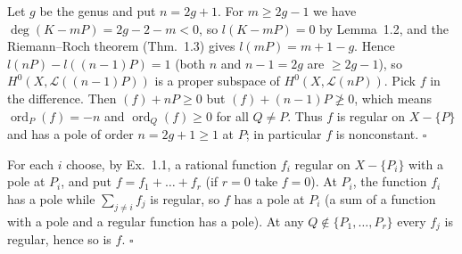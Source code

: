 \documentclass[11pt]{article}
\begin{document}
\pf
Let $g$ be the genus and put $n=2g+1$. For $m\ge 2g-1$ we have $\deg(K-mP)=2g-2-m<0$, so $l(K-mP)=0$ by Lemma~1.2, and the Riemann--Roch theorem (Thm.~1.3) gives $l(mP)=m+1-g$. Hence $l(nP)-l((n-1)P)=1$ (both $n$ and $n-1=2g$ are $\ge 2g-1$), so $H^0(X,\mathcal L((n-1)P))$ is a proper subspace of $H^0(X,\mathcal L(nP))$. Pick $f$ in the difference. Then $(f)+nP\ge0$ but $(f)+(n-1)P\not\ge0$, which means $\operatorname{ord}_P(f)=-n$ and $\operatorname{ord}_Q(f)\ge0$ for all $Q\ne P$. Thus $f$ is regular on $X-\{P\}$ and has a pole of order $n=2g+1\ge1$ at $P$; in particular $f$ is nonconstant. \hfill$\square$

\pf
For each $i$ choose, by Ex.~1.1, a rational function $f_i$ regular on $X-\{P_i\}$ with a pole at $P_i$, and put $f=f_1+\dots+f_r$ (if $r=0$ take $f=0$). At $P_i$, the function $f_i$ has a pole while $\sum_{j\ne i}f_j$ is regular, so $f$ has a pole at $P_i$ (a sum of a function with a pole and a regular function has a pole). At any $Q\notin\{P_1,\dots,P_r\}$ every $f_j$ is regular, hence so is $f$. \hfill$\square$
\end{document}

